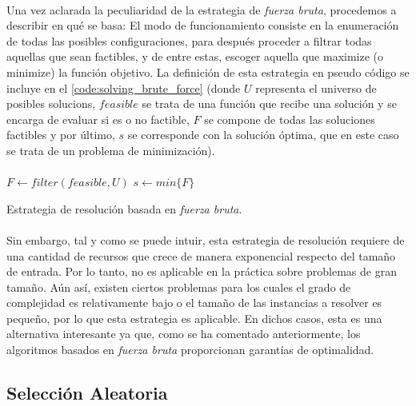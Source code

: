 \documentclass{subfiles}
\begin{document}
        \paragraph{}
        Una vez aclarada la peculiaridad de la estrategia de \emph{fuerza bruta}, procedemos a describir en qué se basa: El modo de funcionamiento consiste en la enumeración de todas las posibles configuraciones, para después proceder a filtrar todas aquellas que sean factibles, y de entre estas, escoger aquella que maximize (o minimize) la función objetivo. La definición de esta estrategia en pseudo código se incluye en el \cref{code:solving_brute_force} (donde $U$ representa el universo de posibles solucions, $feasible$ se trata de una función que recibe una solución y se encarga de evaluar si es o no factible, $F$ se compone de todas las soluciones factibles y por último, $s$ se corresponde con la solución óptima, que en este caso se trata de un problema de minimización).

        \paragraph{}
        \begin{algorithm}
          \SetAlgoLined
          $F \gets filter(feasible, U)$\;
          $s \gets min\{F\}$\;
          \caption{Estrategia de resolución basada en \emph{fuerza bruta}.}
          \label{code:solving_brute_force}
        \end{algorithm}

        \paragraph{}
        Sin embargo, tal y como se puede intuir, esta estrategia de resolución requiere de una cantidad de recursos que crece de manera exponencial respecto del tamaño de entrada. Por lo tanto, no es aplicable en la práctica sobre problemas de gran tamaño. Aún así, existen ciertos problemas para los cuales el grado de complejidad es relativamente bajo o el tamaño de las instancias a resolver es pequeño, por lo que esta estrategia es aplicable. En dichos casos, esta es una alternativa interesante ya que, como se ha comentado anteriormente, los algoritmos basados en \emph{fuerza bruta} proporcionan garantías de optimalidad.  


      \subsection{Selección Aleatoria}
      \label{sec:solving_random}
\end{document}
